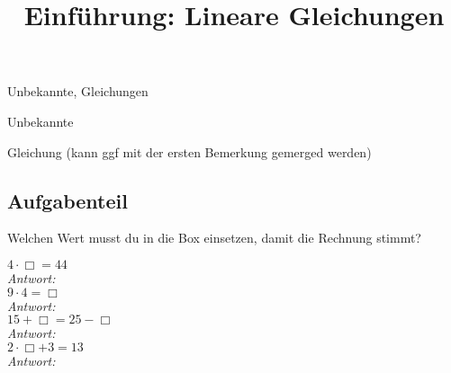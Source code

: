 \documentclass{uebungsblatt}
\title{Einführung: Lineare Gleichungen}
\begin{document}
\maketitle
\begin{contents}
    Unbekannte, Gleichungen
\end{contents}


\begin{remark}
    Unbekannte
\end{remark}

\begin{remark}
    Gleichung (kann ggf mit der ersten Bemerkung gemerged werden)
\end{remark}

\subsection*{Aufgabenteil}

\begin{exercise}
    Welchen Wert musst du in die Box einsetzen, damit die Rechnung stimmt?
    \begin{multicols}{4}
        $4\cdot\Box=44$\\\emph{Antwort:} \\
        $9\cdot4=\Box$\\\emph{Antwort:} \\
        $15+\Box=25-\Box$\\\emph{Antwort:} \\
        $2\cdot\Box+3=13$\\\emph{Antwort:} 
    \end{multicols}
\end{exercise}
\end{document}
